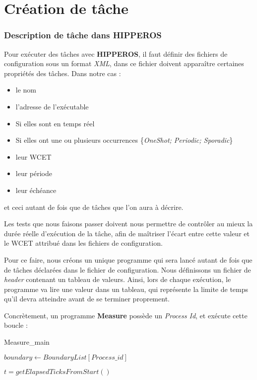 \section{Création de tâche}

	\subsubsection{Description de tâche dans HIPPEROS}
	Pour exécuter des tâches avec \textbf{HIPPEROS}, il faut définir des fichiers de configuration 
	sous un format \textit{XML}, dans ce fichier doivent apparaître certaines propriétés des tâches. 
	Dans notre cas :
	\begin{itemize}
		\setlength\itemsep{0.1em}
		\item le nom
		\item l'adresse de l'exécutable
		\item Si elles sont en temps réel
		\item Si elles ont une ou plusieurs occurrences \{\textit{OneShot; Periodic; Sporadic}\}
		\item leur WCET
		\item leur période
		\item leur échéance
	\end{itemize}
	et ceci autant de fois que de tâches que l'on aura à décrire. \newline
	
	Les tests que nous faisons passer doivent nous permettre de contrôler au mieux la durée réelle 
	d'exécution de la tâche, afin de maîtriser l'écart entre cette valeur et le WCET attribué dans les 
	fichiers de configuration. \newline
	
	Pour ce faire, nous créons un unique programme qui sera lancé autant de fois que de tâches déclarées 
	dans le fichier de configuration. 
	Nous définissons un fichier de \textit{header} contenant un tableau de valeurs. 
	Ainsi, lors de chaque exécution, le programme va lire une valeur dans un tableau, qui représente la 
	limite de temps qu'il devra atteindre avant de se terminer proprement.\newline
	
	Concrètement, un programme \textbf{Measure} possède un \textit{Process Id}, et exécute cette boucle :

	\label{algomeasure}
	\begin{algorithm}[H]
		\caption{Measure\_main}
		\begin{algorithmic}
			\STATE $boundary \leftarrow BoundaryList[Process\_id]$
			\REPEAT \item $t = getElapsedTicksFromStart()$
		\end{algorithmic}
	\end{algorithm}
	
